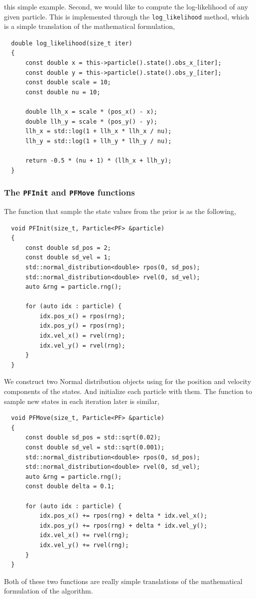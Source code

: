 this simple example. Second, we would like to compute the log-likelihood of any
given particle. This is implemented through the \verb|log_likelihood| method,
which is a simple translation of the mathematical formulation,
\begin{Verbatim}
  double log_likelihood(size_t iter)
  {
      const double x = this->particle().state().obs_x_[iter];
      const double y = this->particle().state().obs_y_[iter];
      const double scale = 10;
      const double nu = 10;

      double llh_x = scale * (pos_x() - x);
      double llh_y = scale * (pos_y() - y);
      llh_x = std::log(1 + llh_x * llh_x / nu);
      llh_y = std::log(1 + llh_y * llh_y / nu);

      return -0.5 * (nu + 1) * (llh_x + llh_y);
  }
\end{Verbatim}

\subsubsection{The \texttt{PFInit} and \texttt{PFMove} functions}

The function that sample the state values from the prior is as the following,
\begin{Verbatim}
  void PFInit(size_t, Particle<PF> &particle)
  {
      const double sd_pos = 2;
      const double sd_vel = 1;
      std::normal_distribution<double> rpos(0, sd_pos);
      std::normal_distribution<double> rvel(0, sd_vel);
      auto &rng = particle.rng();

      for (auto idx : particle) {
          idx.pos_x() = rpos(rng);
          idx.pos_y() = rpos(rng);
          idx.vel_x() = rvel(rng);
          idx.vel_y() = rvel(rng);
      }
  }
\end{Verbatim}
We construct two Normal distribution objects using for the position and
velocity components of the states. And initialize each particle with them. The
function to sample new states in each iteration later is similar,
\begin{Verbatim}
  void PFMove(size_t, Particle<PF> &particle)
  {
      const double sd_pos = std::sqrt(0.02);
      const double sd_vel = std::sqrt(0.001);
      std::normal_distribution<double> rpos(0, sd_pos);
      std::normal_distribution<double> rvel(0, sd_vel);
      auto &rng = particle.rng();
      const double delta = 0.1;

      for (auto idx : particle) {
          idx.pos_x() += rpos(rng) + delta * idx.vel_x();
          idx.pos_y() += rpos(rng) + delta * idx.vel_y();
          idx.vel_x() += rvel(rng);
          idx.vel_y() += rvel(rng);
      }
  }
\end{Verbatim}
Both of these two functions are really simple translations of the mathematical
formulation of the algorithm.

